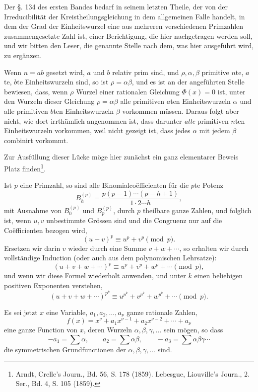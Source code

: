 \documentclass[11pt]{article}
\begin{document}
Der §. 134 des ersten Bandes bedarf in seinem letzten Theile, der von der Irreducibilität der Kreistheilungsgleichung in dem allgemeinen Falle handelt, in dem der Grad der Einheitswurzel eine aus mehreren verschiedenen Primzahlen zusammengesetzte Zahl ist, einer Berichtigung, die hier nachgetragen werden soll, und wir bitten den Leser, die genannte Stelle nach dem, was hier ausgeführt wird, zu ergänzen.

Wenn $n=ab$ gesetzt wird, $a$ und $b$ relativ prim sind, und $\rho,\alpha,\beta$ primitive $n$te, $a$te, $b$te Einheitswurzeln sind, so ist $\rho=\alpha\beta$, und es ist an der angeführten Stelle bewiesen, dass, wenn $\rho$ Wurzel einer rationalen Gleichung $\Phi(x)=0$ ist, unter den Wurzeln dieser Gleichung $\rho=\alpha\beta$ alle primitiven $a$ten Einheitswurzeln $\alpha$ und alle primitiven $b$ten Einheitswurzeln $\beta$ vorkommen müssen. Daraus folgt aber nicht, wie dort irrthümlich angenommen ist, dass darunter \emph{alle} primitiven $n$ten Einheitswurzeln vorkommen, weil nicht gezeigt ist, dass jedes $\alpha$ mit jedem $\beta$ combinirt vorkommt.

Zur Ausfüllung dieser Lücke möge hier zunächst ein ganz elementarer Beweis Platz finden\footnote{Arndt, Crelle's Journ., Bd. 56, S. 178 (1859). Lebesgue, Liouville's Journ., 2. Ser., Bd. 4, S. 105 (1859).}.

Ist $p$ eine Primzahl, so sind alle Binomialcoëfficienten für die $p$te Potenz
\[
B_h^{(p)}=\frac{p(p-1)\cdots(p-h+1)}{1\cdot2\cdots h},
\]
mit Ausnahme von $B_0^{(p)}$ und $B_p^{(p)}$, durch $p$ theilbare ganze Zahlen,
und folglich ist, wenn $u,v$ unbestimmte Grössen sind und die Congruenz nur auf die Coëfficienten bezogen wird,
\[
(u+v)^p\equiv u^p+v^p \pmod p.
\]
Ersetzen wir darin $v$ wieder durch eine Summe $v+w+\cdots$, so erhalten wir durch vollständige Induction (oder auch aus dem polynomischen Lehrsatze):
\[
(u+v+w+\cdots)^p\equiv u^p+v^p+w^p+\cdots \pmod p,
\]
und wenn wir diese Formel wiederholt anwenden, und unter $k$ einen beliebigen positiven Exponenten verstehen,
\begin{equation}\tag{1}
(u+v+w+\cdots)^{p^k}\equiv u^{p^k}+v^{p^k}+w^{p^k}+\cdots \pmod p.
\end{equation}

Es sei jetzt $x$ eine Variable, $a_1,a_2,
\ldots,a_\nu$ ganze rationale Zahlen,
\[
f(x)=x^\nu+a_1x^{\nu-1}+a_2x^{\nu-2}+\cdots+a_\nu
\]
eine ganze Function von $x$, deren Wurzeln $\alpha,\beta,\gamma,\ldots$ sein mögen, so dass
\[
-a_1=\sum\alpha,\qquad a_2=\sum\alpha\beta,\qquad -a_3=\sum\alpha\beta\gamma\cdots
\]
die symmetrischen Grundfunctionen der $\alpha,\beta,\gamma,\ldots$ sind.
\end{document}
